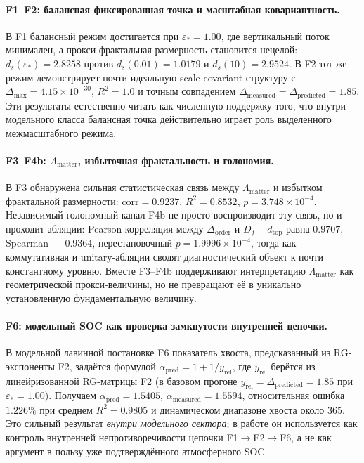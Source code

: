 \documentclass[11pt,a4paper]{article}
\theoremstyle{definition}
\theoremstyle{plain}
\theoremstyle{remark}
\begin{document}
\paragraph{F1--F2: балансная фиксированная точка и масштабная ковариантность.}
В F1 балансный режим достигается при $\varepsilon_\ast=1.00$, где вертикальный поток минимален,
а прокси-фрактальная размерность становится нецелой: $d_s(\varepsilon_\ast)=2.8258$ против
$d_s(0.01)=1.0179$ и $d_s(10)=2.9524$.
В F2 тот же режим демонстрирует почти идеальную scale-covariant структуру с
$\Delta_{\max}=4.15\times10^{-30}$, $R^2=1.0$ и точным совпадением
$\Delta_{\mathrm{measured}}=\Delta_{\mathrm{predicted}}=1.85$.
Эти результаты естественно читать как численную поддержку того, что внутри модельного класса
балансная точка действительно играет роль выделенного межмасштабного режима.

\paragraph{F3--F4b: $\Lambda_{\mathrm{matter}}$, избыточная фрактальность и голономия.}
В F3 обнаружена сильная статистическая связь между $\Lambda_{\mathrm{matter}}$ и избытком фрактальной размерности:
$\mathrm{corr}=0.9237$, $R^2=0.8532$, $p=3.748\times10^{-4}$.
Независимый голономный канал F4b не просто воспроизводит эту связь, но и проходит абляции:
Pearson-корреляция между $\Delta_{\mathrm{order}}$ и $D_f-d_{\mathrm{top}}$ равна $0.9707$,
Spearman --- $0.9364$, перестановочный $p=1.9996\times10^{-4}$, тогда как коммутативная и unitary-абляции
сводят диагностический объект к почти константному уровню.
Вместе F3--F4b поддерживают интерпретацию $\Lambda_{\mathrm{matter}}$ как геометрической прокси-величины,
но не превращают её в уникально установленную фундаментальную величину.

\paragraph{F6: модельный SOC как проверка замкнутости внутренней цепочки.}
В модельной лавинной постановке F6 показатель хвоста, предсказанный из RG-экспоненты F2,
задаётся формулой $\alpha_{\mathrm{pred}}=1+1/y_{\mathrm{rel}}$, где $y_{\mathrm{rel}}$
берётся из линейризованной RG-матрицы F2
(в базовом прогоне $y_{\mathrm{rel}}=\Delta_{\mathrm{predicted}}=1.85$ при $\varepsilon_\ast=1.00$).
Получаем $\alpha_{\mathrm{pred}}=1.5405$,
$\alpha_{\mathrm{measured}}=1.5594$, относительная ошибка $1.226\%$ при среднем $R^2=0.9805$
и динамическом диапазоне хвоста около $365$.
Это сильный результат \emph{внутри модельного сектора}; в работе он используется как контроль внутренней непротиворечивости
цепочки F1$\to$F2$\to$F6, а не как аргумент в пользу уже подтверждённого атмосферного SOC.
\end{document}

